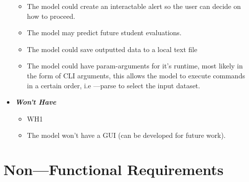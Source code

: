 \begin{itemize}
\begin{itemize}
            \item The model could create an interactable alert so the user can decide on how to proceed.
            \item The model may predict future student evaluations.
            \item The model could save outputted data to a local text file
            \item The model could have param-arguments for it's runtime, most likely in the form of CLI arguments, this allows the model to execute commands in a certain order, i.e \verb-----parse to select the input dataset.
        \end{itemize}
    \item \textbf{\textit{Won't Have}}
        \begin{itemize}\label{FWH}
            \item WH1
            \item The model won’t have a GUI (can be developed for future work).
        \end{itemize}
\end{itemize}

\section{Non---Functional Requirements} \label{section:NonFunctionalRequirements}


